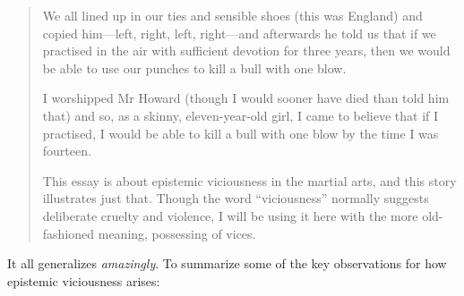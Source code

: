 \begin{quotation}
{
 We all lined up in our ties and sensible shoes (this was England)
and copied him---left, right, left, right---and afterwards he told us
that if we practised in the air with sufficient devotion for three
years, then we would be able to use our punches to kill a bull with one
blow.}

{
 I worshipped Mr Howard (though I would sooner have died than told
him that) and so, as a skinny, eleven-year-old girl, I came to believe
that if I practised, I would be able to kill a bull with one blow by
the time I was fourteen.}

{
 This essay is about epistemic viciousness in the martial arts, and
this story illustrates just that. Though the word
``viciousness'' normally suggests
deliberate cruelty and violence, I will be using it here with the more
old-fashioned meaning, possessing of vices.}
\end{quotation}

{
 It all generalizes \textit{amazingly}. To summarize some of the
key observations for how epistemic viciousness arises:}

